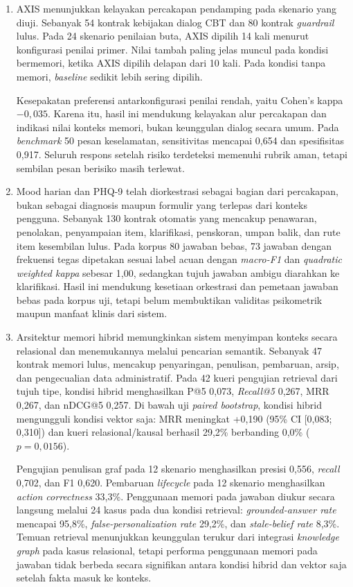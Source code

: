 \begin{enumerate}[label=\arabic*.,leftmargin=*,itemsep=4pt]

    \item AXIS menunjukkan kelayakan percakapan pendamping pada skenario yang
diuji. Sebanyak 54 kontrak kebijakan dialog CBT dan 80 kontrak \textit{guardrail}
lulus. Pada 24 skenario penilaian buta, AXIS dipilih 14 kali menurut konfigurasi
penilai primer. Nilai tambah paling jelas muncul pada kondisi bermemori, ketika
AXIS dipilih delapan dari 10 kali. Pada kondisi tanpa memori, \textit{baseline}
sedikit lebih sering dipilih.

Kesepakatan preferensi antarkonfigurasi penilai rendah, yaitu Cohen's kappa
$-0,035$. Karena itu, hasil ini mendukung kelayakan alur percakapan dan indikasi
nilai konteks memori, bukan keunggulan dialog secara umum. Pada \textit{benchmark}
50 pesan keselamatan, sensitivitas mencapai 0,654 dan spesifisitas 0,917.
Seluruh respons setelah risiko terdeteksi memenuhi rubrik aman, tetapi sembilan
pesan berisiko masih terlewat.

\item Mood harian dan PHQ-9 telah diorkestrasi sebagai bagian dari
percakapan, bukan sebagai diagnosis maupun formulir yang terlepas dari konteks
pengguna. Sebanyak 130 kontrak otomatis yang mencakup penawaran, penolakan,
penyampaian item, klarifikasi, penskoran, umpan balik, dan rute item kesembilan
lulus. Pada korpus 80 jawaban bebas, 73 jawaban dengan frekuensi tegas dipetakan
sesuai label acuan dengan \textit{macro-F1} dan \textit{quadratic weighted
kappa} sebesar 1,00, sedangkan tujuh jawaban ambigu diarahkan ke klarifikasi.
Hasil ini mendukung kesetiaan orkestrasi dan pemetaan jawaban bebas pada korpus
uji, tetapi belum membuktikan validitas psikometrik maupun manfaat klinis dari
sistem.

    \item Arsitektur memori hibrid memungkinkan sistem menyimpan konteks secara
relasional dan menemukannya melalui pencarian semantik. Sebanyak 47 kontrak
memori lulus, mencakup penyaringan, penulisan, pembaruan, arsip, dan pengecualian
data administratif. Pada 42 kueri pengujian retrieval dari tujuh tipe, kondisi
hibrid menghasilkan P@5 0,073, \textit{Recall@5} 0,267, MRR 0,267, dan nDCG@5
0,257. Di bawah uji \textit{paired bootstrap}, kondisi hibrid mengungguli kondisi
vektor saja: MRR meningkat +0,190 (95\% CI [0,083; 0,310]) dan kueri
relasional/kausal berhasil 29,2\% berbanding 0,0\% ($p = 0,0156$).

Pengujian penulisan graf pada 12 skenario menghasilkan presisi 0,556,
\textit{recall} 0,702, dan F1 0,620. Pembaruan \textit{lifecycle} pada 12
skenario menghasilkan \textit{action correctness} 33,3\%. Penggunaan memori pada
jawaban diukur secara langsung melalui 24 kasus pada dua kondisi retrieval:
\textit{grounded-answer rate} mencapai 95,8\%, \textit{false-personalization rate}
29,2\%, dan \textit{stale-belief rate} 8,3\%. Temuan retrieval menunjukkan
keunggulan terukur dari integrasi \textit{knowledge graph} pada kasus relasional,
tetapi performa penggunaan memori pada jawaban tidak berbeda secara signifikan
antara kondisi hibrid dan vektor saja setelah fakta masuk ke konteks.


\end{enumerate}
